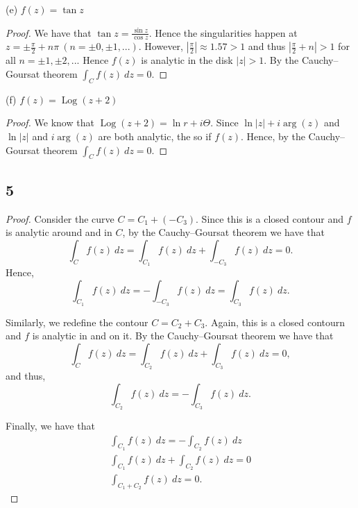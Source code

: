 \documentclass{article}
\DeclareMathOperator*{\Log}{Log}
\begin{document}
(e) $f(z) = \tan z$
\begin{proof}
    We have that $\tan z = \frac{\sin z}{\cos z}$. Hence the singularities happen
    at $z = \pm \frac{\pi}{2} + n\pi \ (n = \pm 0, \pm 1,...)$. However,
    $|\frac{\pi}{2}| \approx 1.57 > 1$ and thus $|\frac{\pi}{2} + n| > 1$ for all
    $n = \pm 1, \pm 2,...$ Hence $f(z)$ is analytic in the disk $|z| > 1$.
    By the Cauchy–Goursat theorem $\int_C f(z) \ dz = 0$.
\end{proof}

(f) $f(z) = \Log(z + 2)$
\begin{proof}
    We know that $\Log(z + 2) = \ln r + i\Theta$. Since $\ln |z| + i\arg(z)$
    and $\ln|z|$ and $i\arg(z)$ are both analytic, the so if $f(z)$. Hence, by
    the Cauchy–Goursat theorem $\int_C f(z) \ dz = 0$.
\end{proof}

\subsection*{5}
\begin{proof}
    Consider the curve $C = C_1 + (-C_3)$. Since this is a closed contour and
    $f$ is analytic around and in $C$, by the Cauchy–Goursat theorem we have
    that
    \begin{equation*}
        \int_C f(z) \ dz = \int_{C_1} f(z) \ dz + \int_{-C_3} f(z) \ dz = 0.
    \end{equation*}
    Hence,
    \begin{equation*}
        \int_{C_1} f(z) \ dz = -\int_{-C_3} f(z) \ dz = \int_{C_3} f(z) \ dz.
    \end{equation*}

    Similarly, we redefine the contour $C = C_2 + C_3$. Again, this is a closed
    contourn and $f$ is analytic in and on it. By the Cauchy–Goursat theorem
    we have that
    \begin{equation*}
        \int_C f(z) \ dz = \int_{C_2} f(z) \ dz + \int_{C_3} f(z) \ dz = 0,
    \end{equation*}
    and thus,
    \begin{equation*}
        \int_{C_2} f(z) \ dz = -\int_{C_3} f(z) \ dz.
    \end{equation*}

    Finally, we have that
    \begin{gather*}
        \int_{C_1} f(z) \ dz = -\int_{C_2} f(z) \ dz \\
        \int_{C_1} f(z) \ dz + \int_{C_2} f(z) \ dz  = 0\\
        \int_{C_1 + C_2} f(z) \ dz = 0.
    \end{gather*}
\end{proof}
\end{document}
